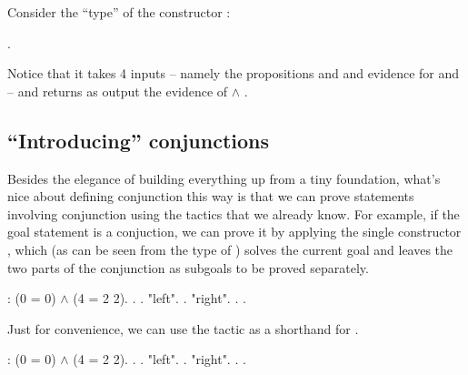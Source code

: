\documentclass[12pt]{report}
\begin{document}
 Consider the ``type'' of the constructor : \begin{coqdoccode}
\coqdocemptyline
\coqdocnoindent
{} .\coqdoceol
\coqdocemptyline
\end{coqdoccode}
Notice that it takes 4 inputs -- namely the propositions 
    and  and evidence for  and  -- and returns as output the
    evidence of  \ensuremath{\land} . 

\subsection{``Introducing'' conjunctions}

 Besides the elegance of building everything up from a tiny
    foundation, what's nice about defining conjunction this way is
    that we can prove statements involving conjunction using the
    tactics that we already know.  For example, if the goal statement
    is a conjuction, we can prove it by applying the single
    constructor , which (as can be seen from the type of )
    solves the current goal and leaves the two parts of the
    conjunction as subgoals to be proved separately. \begin{coqdoccode}
\coqdocemptyline
\coqdocnoindent
{}  : \coqdoceol
\coqdocindent{1.00em}
(0 = 0) \ensuremath{\land} (4 =  2 2).\coqdoceol
\coqdocnoindent
{}.\coqdoceol
\coqdocindent{1.00em}
 .\coqdoceol
\coqdocindent{1.00em}
 "left". .\coqdoceol
\coqdocindent{1.00em}
 "right". . .\coqdoceol
\coqdocemptyline
\end{coqdoccode}
Just for convenience, we can use the tactic  as a shorthand for
     . \begin{coqdoccode}
\coqdocemptyline
\coqdocnoindent
{}  : \coqdoceol
\coqdocindent{1.00em}
(0 = 0) \ensuremath{\land} (4 =  2 2).\coqdoceol
\coqdocnoindent
{}.\coqdoceol
\coqdocindent{1.00em}
.\coqdoceol
\coqdocindent{2.00em}
 "left". .\coqdoceol
\coqdocindent{2.00em}
 "right". . .\coqdoceol
\coqdocemptyline
\end{coqdoccode}
\end{document}
